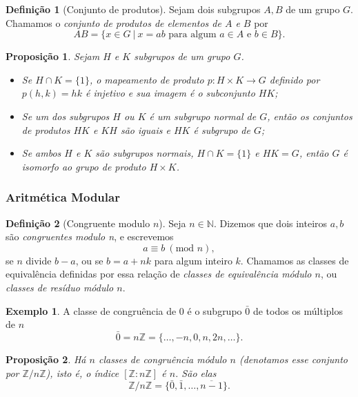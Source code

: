 \documentclass[a4paper,12pt]{report}
\theoremstyle{plain}
\newtheorem{proposicao}{Proposição}[section]
\theoremstyle{definition}
\newtheorem{definicao}{Definição}[section]
\newtheorem{exemplo}{Exemplo}[section]
\begin{document}
	\begin{definicao}[Conjunto de produtos]
		Sejam dois subgrupos \(A,B\) de um grupo \(G\).
		Chamamos o \emph{conjunto de produtos de elementos de \(A\) e \(B\)} por
		\[AB = \{x\in G \ | \ x = ab \text{ para algum }a\in A\text{ e }b\in B\}.\]
	\end{definicao}
	
	\begin{proposicao}
		Sejam \(H\) e \(K\) subgrupos de um grupo \(G\).
		\begin{itemize}
			\item Se \(H\cap K = \{1\}\), o mapeamento de produto
			\(p: H\times K\longrightarrow G\) definido por \(p(h,k) = hk\) é
			injetivo e sua imagem é o subconjunto \(HK\);
			\item Se um dos subgrupos
			\(H\) ou \(K\) é um subgrupo normal de \(G\), então os conjuntos de
			produtos \(HK\) e \(KH\) são iguais e \(HK\) é subgrupo de \(G\);
			\item Se ambos \(H\) e \(K\) são subgrupos normais, \(H\cap K = \{1\}\) e
			\(HK = G\), então \(G\) é isomorfo ao grupo de produto \(H\times K\).
		\end{itemize}
	\end{proposicao}
	
	\subsubsection{Aritmética Modular}
	
	\begin{definicao}[Congruente modulo $n$]
		Seja \(n\in\mathbb{N}\). Dizemos que dois inteiros
		\(a,b\) são \emph{congruentes modulo n}, e escrevemos
		\[ a \equiv b \ (\text{mod }n),\]
		se \(n\) divide \(b-a\), ou se \(b = a + nk\) para algum inteiro \(k\).
		Chamamos as classes de equivalência definidas por essa relação de
		\emph{classes de equivalência módulo \(n\)}, ou \emph{classes de resíduo módulo \(n\)}.	
	\end{definicao}
	
	\begin{exemplo}
		A classe de congruência de 0 é o subgrupo \(\bar{0}\)
		de todos os múltiplos de \(n\) \[\bar{0} = n\mathbb{Z} = \{\dots,-n,0,n,2n, \dots\}.\]
	\end{exemplo}
	
	\begin{proposicao}
		Há \(n\) classes de congruência módulo \(n\) (denotamos esse conjunto por \(\mathbb{Z}/n\mathbb{Z}\)), isto é, o índice \([\mathbb{Z}:n\mathbb{Z}]\) é \(n\). São elas \[\mathbb{Z}/n\mathbb{Z} =  \{\bar{0}, \bar{1},\dots,\overline{n - 1}\}.\]		
	\end{proposicao}
	
\end{document}
